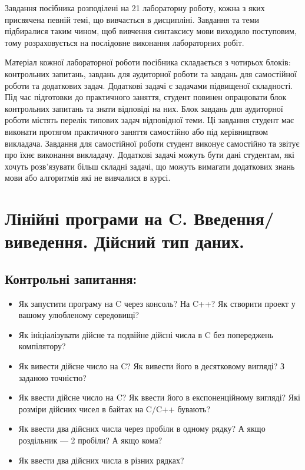 \documentclass[a5paper,titlepage,openany,twoside,
]
{book_unv}%
\begin{document}
Завдання посібника розподілені на 21 лабораторну роботу, кожна з яких
присвячена певній темі, що вивчається в дисципліні. Завдання та теми
підбиралися таким чином, щоб вивчення синтаксису мови виходило
поступовим, тому розраховується на послідовне виконання лабораторних робіт.


Матеріал кожної лабораторної роботи посібника складається з чотирьох
блоків: контрольних запитань, завдань для аудиторної роботи та
завдань для самостійної роботи та додаткових задач.
Додаткові задачі є задачами підвищеної складності.
Під час підготовки до практичного
заняття, студент повинен опрацювати блок контрольних запитань та знати
відповіді на них. Блок завдань для аудиторної роботи містять перелік
типових задач відповідної теми. Ці завдання студент має виконати
протягом практичного заняття самостійно або під керівництвом викладача.
Завдання для самостійної роботи студент виконує самостійно та звітує про
їхнє виконання викладачу. Додаткові задачі можуть бути дані студентам, які
хочуть розв'язувати більш складні задачі, що можуть вимагати додаткових
знань мови або алгоритмів які не вивчалися в курсі.



\chapter{ Лінійні програми на C. Введення/виведення. Дійсний тип даних. }
%

\section{Контрольні запитання:}

\begin{itemize}
\item
Як запустити програму на C через консоль? На C++? Як створити
проект у вашому улюбленому середовищі?
\item
Як ініціалізувати дійсне та подвійне дійсні числа в C без попереджень
компілятору?

\item
Як вивести дійсне число на C? Як вивести його в десятковому вигляді?
З заданою точністю?

\item
Як ввести дійсне число на C? Як ввести його в
експоненційному вигляді? Які розміри дійсних чисел в байтах на C/C++
бувають?

\item
Як ввести два дійсних числа через пробіли в одному рядку? А якщо
роздільник --- 2 пробіли? А якщо кома?
\item
Як ввести два дійсних числа в різних рядках?

\end{itemize}
\end{document}
